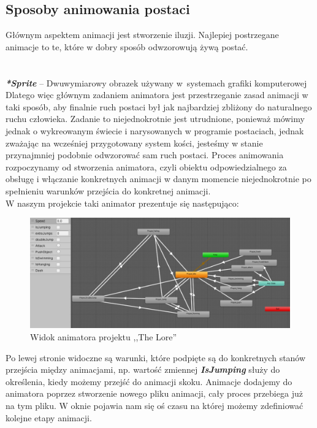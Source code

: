 \documentclass[oneside,polski,logo]{amuthesis}
\begin{document}
\subsection{Sposoby animowania postaci}
Głównym aspektem animacji jest stworzenie iluzji. Najlepiej postrzegane animacje to te, które w dobry sposób odwzorowują żywą postać.\\
\noindent\makebox[\linewidth]{\rule{15cm}{0.4pt}}\\
\\
\textbf{\textit{*Sprite}} – Dwuwymiarowy obrazek używany w~systemach grafiki komputerowej \newpage
Dlatego więc głównym zadaniem animatora jest przestrzeganie zasad animacji w taki sposób, aby finalnie ruch postaci był jak najbardziej zbliżony do naturalnego ruchu człowieka.
Zadanie to niejednokrotnie jest utrudnione, ponieważ mówimy jednak o wykreowanym świecie i narysowanych w programie postaciach, jednak zważając na wcześniej przygotowany system kości, jesteśmy w stanie przynajmniej podobnie odwzorować sam ruch postaci. 
Proces animowania rozpoczynamy od stworzenia animatora, czyli obiektu odpowiedzialnego za obsługę i włączanie konkretnych animacji w danym momencie niejednokrotnie po spełnieniu warunków przejścia do konkretnej animacji. \cite{animation1} \\
W naszym projekcie taki animator prezentuje się następująco:

\begin{figure}[h]
	\centering
	\includegraphics[width=13cm]{images/kozubal/animator.jpg}
	\caption{Widok animatora projektu ,,The Lore''}
\end{figure}

Po lewej stronie widoczne są warunki, które podpięte są do konkretnych stanów przejścia między animacjami, np. wartość zmiennej \textbf{\textit{IsJumping}} służy do określenia, kiedy możemy przejść do animacji skoku. Animacje dodajemy do animatora poprzez stworzenie nowego pliku animacji, cały proces przebiega już na tym pliku. W oknie pojawia nam się oś czasu na której możemy zdefiniować kolejne etapy animacji.\\
\end{document}

